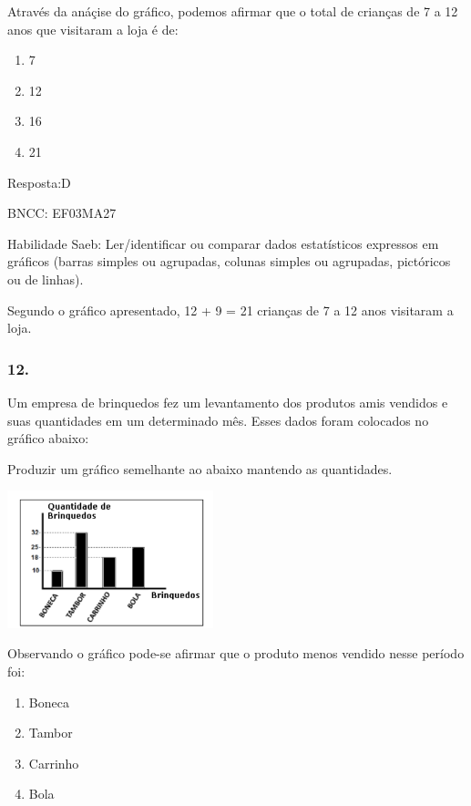 Através da anáçise do gráfico, podemos afirmar que o total de crianças
de 7 a 12 anos que visitaram a loja é de:

\begin{enumerate}
\def\labelenumi{\alph{enumi})}
\item
  7
\item
  12
\item
  16
\item
  21
\end{enumerate}

Resposta:D

BNCC: EF03MA27

Habilidade Saeb: Ler/identificar ou comparar dados estatísticos
expressos em gráficos (barras simples ou agrupadas, colunas simples ou
agrupadas, pictóricos ou de linhas).

Segundo o gráfico apresentado, 12 + 9 = 21 crianças de 7 a 12 anos
visitaram a loja.

\subsubsection{12.}\label{section-178}

Um empresa de brinquedos fez um levantamento dos produtos amis vendidos
e suas quantidades em um determinado mês. Esses dados foram colocados no
gráfico abaixo:

Produzir um gráfico semelhante ao abaixo mantendo as quantidades.

\includegraphics[width=2.35294in,height=1.56863in]{media/image137.png}

Observando o gráfico pode-se afirmar que o produto menos vendido nesse
período foi:

\begin{enumerate}
\def\labelenumi{\alph{enumi})}
\item
  Boneca
\item
  Tambor
\item
  Carrinho
\item
  Bola
\end{enumerate}

